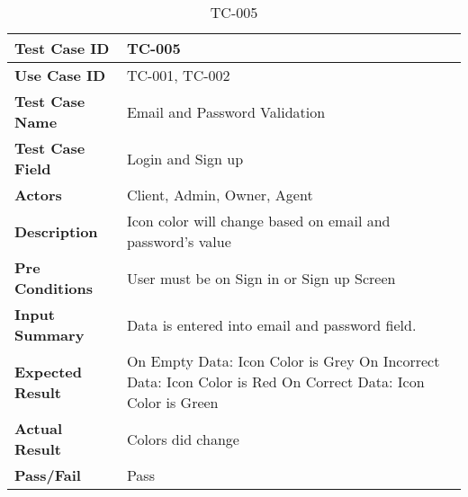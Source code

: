 
\begin{table}[h]
    \centering
    \caption{TC-005}
    \begin{tabular}{ |p{3.8cm}|p{8cm}| }
        \hline
        \textbf{Test Case ID}    & TC-005                                                     \\
        \hline
        \textbf{Use Case ID}     & TC-001, TC-002                                             \\
        \hline
        \textbf{Test Case Name}  & Email and Password Validation                              \\
        \hline
        \textbf{Test Case Field} & Login and Sign up                                          \\
        \hline
        \textbf{Actors}          & Client, Admin, Owner, Agent                                \\
        \hline
        \textbf{Description}     & Icon color will change based on email and password's value \\
        \hline
        \textbf{Pre Conditions}  & User must be on Sign in or Sign up Screen                  \\
        \hline
        \textbf{Input Summary}   & Data is entered into email and password field.             \\
        \hline
        \textbf{Expected Result} &
        On Empty Data: Icon Color is Grey  \newline
        On Incorrect Data: Icon Color is Red  \newline
        On Correct Data: Icon Color is Green                                                  \\
        \hline
        \textbf{Actual Result}   & Colors did change                                          \\
        \hline
        \textbf{Pass/Fail}       & Pass                                                       \\
        \hline
    \end{tabular}
\end{table}